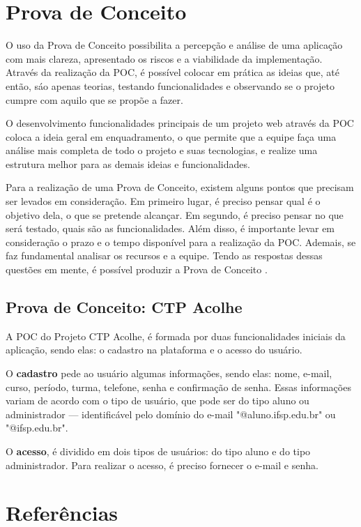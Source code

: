 \documentclass[12pt,a4paper]{article}
\begin{document}
\section{Prova de Conceito}
O uso da Prova de Conceito possibilita a percepção e análise de uma aplicação com mais clareza, apresentado os riscos e a viabilidade da implementação. Através da realização da POC, é possível colocar em prática as ideias que, até então, sáo apenas teorias, testando funcionalidades e observando se o projeto cumpre com aquilo que se propõe a fazer. 

O desenvolvimento funcionalidades principais de um projeto web através da POC coloca a ideia geral em enquadramento, o que permite que a equipe faça uma análise mais completa de todo o projeto e suas tecnologias, e realize uma estrutura melhor para as demais ideias e funcionalidades. 

Para a realização de uma Prova de Conceito, existem alguns pontos que precisam ser levados em consideração. Em primeiro lugar, é preciso pensar qual é o objetivo dela, o que se pretende alcançar. Em segundo, é preciso pensar no que será testado, quais são as funcionalidades. Além disso, é importante levar em consideração o prazo e o tempo disponível para a realização da POC. Ademais, se faz fundamental analisar os recursos e a equipe. Tendo as respostas dessas questões em mente, é possível produzir a Prova de Conceito \cite{gaspar} \cite{supero}.

\subsection{Prova de Conceito: CTP Acolhe}
A POC do Projeto CTP Acolhe, é formada por duas funcionalidades iniciais da aplicação, sendo elas: o cadastro na plataforma e o acesso do usuário. 

O \textbf{cadastro} pede ao usuário algumas informações, sendo elas: nome, e-mail, curso, período, turma, telefone, senha e confirmação de senha. Essas informações variam de acordo com o tipo de usuário, que pode ser do tipo aluno ou administrador — identificável pelo domínio do e-mail "@aluno.ifsp.edu.br" ou "@ifsp.edu.br".

O \textbf{acesso}, é dividido em dois tipos de usuários: do tipo aluno e do tipo administrador. Para realizar o acesso, é preciso fornecer o e-mail e senha.  

\newpage

\section{Referências}
{}
%

\end{document}
